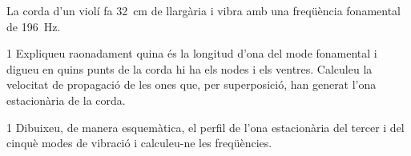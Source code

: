 La corda d'un violí fa 32~cm de llargària i vibra amb una freqüència fonamental de 196~Hz.


\begin{apartat}{1}
Expliqueu raonadament quina és la longitud d'ona del mode fonamental i digueu en quins punts de la corda hi ha els nodes i els ventres. Calculeu la velocitat de propagació de les ones que, per superposició, han generat l'ona estacionària de la corda.
\end{apartat}

\begin{apartat}{1}
Dibuixeu, de manera esquemàtica, el perfil de l'ona estacionària del tercer i del cinquè modes de vibració i calculeu-ne les freqüències.
\end{apartat}

